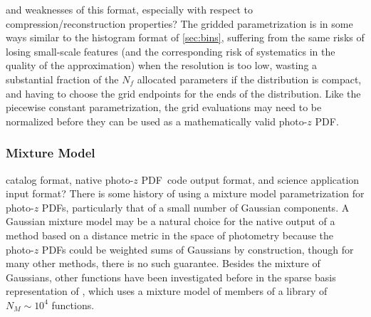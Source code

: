 \documentclass[\docopts]{\docclass}
\newcommand{\pz}{photo-$z$ PDF}
\begin{document}
and weaknesses of this format, especially with respect to 
compression/reconstruction properties?
The gridded parametrization is in some ways similar to the histogram format of 
\ref{sec:bins}, suffering from the same risks of losing small-scale features 
(and the corresponding risk of systematics in the quality of the approximation) 
when the resolution is too low, wasting a substantial fraction of the $N_{f}$ 
allocated parameters if the distribution is compact, and having to choose the 
grid endpoints for the ends of the distribution.  Like the piecewise constant 
parametrization, the grid evaluations may need to be normalized before they can 
be used as a mathematically valid \pz.

\subsubsection{Mixture Model}
\label{sec:mm}

catalog format, native \pz\ code output format, and science application input 
format?
There is some history of using a mixture model parametrization for \pz s, 
particularly that of a small number of Gaussian components.    A Gaussian mixture model may be a 
natural choice for the native output of a method based on a distance metric in 
the space of photometry because the \pz s could be weighted sums of Gaussians 
by construction, though for many other methods, there is no such guarantee.  
Besides the mixture of Gaussians, other functions have been investigated before 
in the sparse basis representation of \citet{carrasco_kind_sparse_2014}, which 
uses a mixture model of members of a library of $N_{M}\sim10^{4}$ functions.
\end{document}
